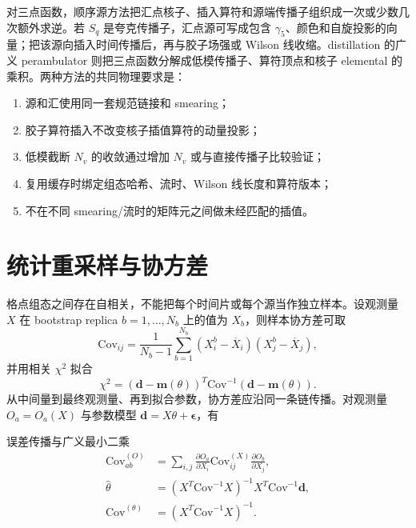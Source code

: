 \documentclass[UTF8,12pt,a4paper,twoside,openany]{ctexbook}
\begin{document}
对三点函数，顺序源方法把汇点核子、插入算符和源端传播子组织成一次或少数几次额外求逆。若 \(S_q\) 是夸克传播子，汇点源可写成包含 \(\gamma_5\)、颜色和自旋投影的向量；把该源向插入时间传播后，再与胶子场强或 Wilson 线收缩。distillation 的广义 perambulator 则把三点函数分解成低模传播子、算符顶点和核子 elemental 的乘积。两种方法的共同物理要求是：
\begin{enumerate}
  \item 源和汇使用同一套规范链接和 smearing；
  \item 胶子算符插入不改变核子插值算符的动量投影；
  \item 低模截断 \(N_v\) 的收敛通过增加 \(N_v\) 或与直接传播子比较验证；
  \item 复用缓存时绑定组态哈希、流时、Wilson 线长度和算符版本；
  \item 不在不同 smearing/流时的矩阵元之间做未经匹配的插值。
\end{enumerate}

\section{统计重采样与协方差}

格点组态之间存在自相关，不能把每个时间片或每个源当作独立样本。设观测量 \(X\) 在 bootstrap replica \(b=1,\dots,N_b\) 上的值为 \(X_b\)，则样本协方差可取
\begin{equation}
  \mathrm{Cov}_{ij}
  =\frac{1}{N_b-1}\sum_{b=1}^{N_b}
  (X_i^b-\overline X_i)(X_j^b-\overline X_j),
  \label{eq:bootstrapcov}
\end{equation}
并用相关 \(\chi^2\) 拟合
\begin{equation}
  \chi^2
  =(\mathbf d-\mathbf m(\theta))^T
  \mathrm{Cov}^{-1}
  (\mathbf d-\mathbf m(\theta)).
  \label{eq:chi2}
\end{equation}
从中间量到最终观测量、再到拟合参数，协方差应沿同一条链传播。对观测量 \(O_a=O_a(X)\) 与参数模型 \(\mathbf d=X\theta+\boldsymbol\epsilon\)，有
\begin{keyformula}{误差传播与广义最小二乘}
\begin{align}
  \mathrm{Cov}_{ab}^{(O)}
  &=\sum_{i,j}
  \frac{\partial O_a}{\partial X_i}
  \mathrm{Cov}_{ij}^{(X)}
  \frac{\partial O_b}{\partial X_j},
  \label{eq:errorpropagation}\\
  \widehat{\theta}
  &=\left(X^T\mathrm{Cov}^{-1}X\right)^{-1}
  X^T\mathrm{Cov}^{-1}\mathbf d,
  \label{eq:gls}\\
  \mathrm{Cov}^{(\theta)}
  &=\left(X^T\mathrm{Cov}^{-1}X\right)^{-1}.
  \label{eq:glscov}
\end{align}
\end{keyformula}
\end{document}
